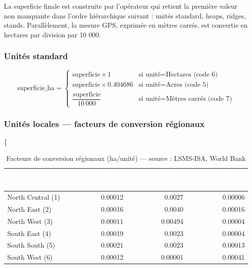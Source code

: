 \documentclass[
  french,
  10pt,
]{article}
\begin{document}
La superficie finale est construite par l'opérateur qui retient la
première valeur non manquante dans l'ordre hiérarchique suivant : unités
standard, heaps, ridges, stands. Parallèlement, la mesure GPS, exprimée
en mètres carrés, est convertie en hectares par division par 10 000.

\subsubsection{Unités standard}\label{unituxe9s-standard}

\begin{equation}
\text{superficie\_ha} = \begin{cases}
\text{superficie} \times 1 & \text{si unité} = \text{Hectares (code 6)} \\[4pt]
\text{superficie} \times 0.404686 & \text{si unité} = \text{Acres (code 5)} \\[4pt]
\dfrac{\text{superficie}}{10\,000} & \text{si unité} = \text{Mètres carrés (code 7)}
\end{cases}
\end{equation}

\subsubsection{Unités locales --- facteurs de conversion
régionaux}\label{unituxe9s-locales-facteurs-de-conversion-ruxe9gionaux}

\{ \small {}

\begin{table}

\caption{\label{tab:table-conversion}Facteurs de conversion régionaux (ha/unité) --- source : LSMS-ISA, World Bank}
\centering
\begin{tabular}[t]{lrrr}
\toprule
\cellcolor{NavyBlue}\textcolor{white}{\textbf{Zone géographique}} & \cellcolor{NavyBlue}\textcolor{white}{\textbf{Heaps (ha/heap)}} & \cellcolor{NavyBlue}\textcolor{white}{\textbf{Ridges (ha/ridge)}} & \cellcolor{NavyBlue}\textcolor{white}{\textbf{Stands (ha/stand)}}\\
\midrule
North Central (1) & 0.00012 & 0.0027 & 0.00006\\
North East (2) & 0.00016 & 0.0040 & 0.00016\\
North West (3) & 0.00011 & 0.00494 & 0.00004\\
South East (4) & 0.00019 & 0.0023 & 0.00004\\
South South (5) & 0.00021 & 0.0023 & 0.00013\\
South West (6) & 0.00012 & 0.00001 & 0.00041\\
\bottomrule
\end{tabular}
\end{table}
\vspace{2pt}
\end{document}
